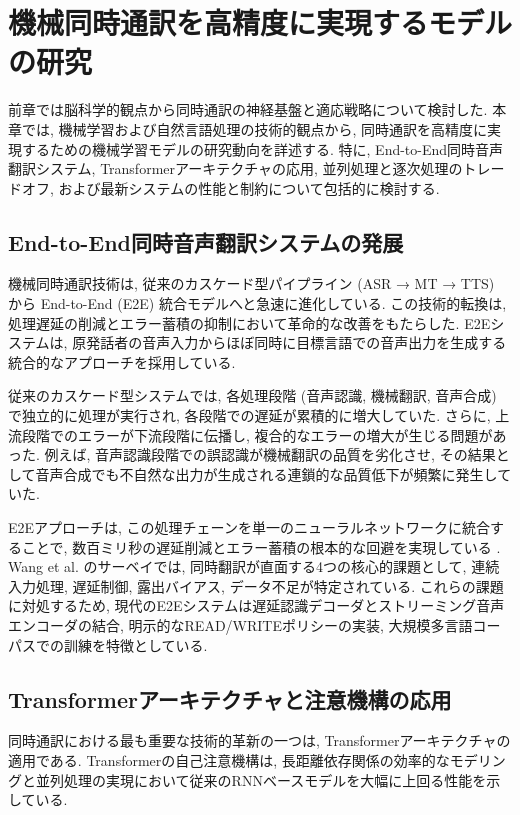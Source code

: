 \section{機械同時通訳を高精度に実現するモデルの研究}

前章では脳科学的観点から同時通訳の神経基盤と適応戦略について検討した.
本章では, 機械学習および自然言語処理の技術的観点から, 同時通訳を高精度に実現するための機械学習モデルの研究動向を詳述する.
特に, End-to-End同時音声翻訳システム, Transformerアーキテクチャの応用, 並列処理と逐次処理のトレードオフ, および最新システムの性能と制約について包括的に検討する.

\subsection{End-to-End同時音声翻訳システムの発展}

機械同時通訳技術は, 従来のカスケード型パイプライン (ASR → MT → TTS) から End-to-End (E2E) 統合モデルへと急速に進化している.
この技術的転換は, 処理遅延の削減とエラー蓄積の抑制において革命的な改善をもたらした.
E2Eシステムは, 原発話者の音声入力からほぼ同時に目標言語での音声出力を生成する統合的なアプローチを採用している.

従来のカスケード型システムでは, 各処理段階 (音声認識, 機械翻訳, 音声合成) で独立的に処理が実行され, 各段階での遅延が累積的に増大していた.
さらに, 上流段階でのエラーが下流段階に伝播し, 複合的なエラーの増大が生じる問題があった.
例えば, 音声認識段階での誤認識が機械翻訳の品質を劣化させ, その結果として音声合成でも不自然な出力が生成される連鎖的な品質低下が頻繁に発生していた.

E2Eアプローチは, この処理チェーンを単一のニューラルネットワークに統合することで, 数百ミリ秒の遅延削減とエラー蓄積の根本的な回避を実現している \cite{wang2024recent}.
Wang et al. \cite{wang2024recent} のサーベイでは, 同時翻訳が直面する4つの核心的課題として, 連続入力処理, 遅延制御, 露出バイアス, データ不足が特定されている.
これらの課題に対処するため, 現代のE2Eシステムは遅延認識デコーダとストリーミング音声エンコーダの結合, 明示的なREAD/WRITEポリシーの実装, 大規模多言語コーパスでの訓練を特徴としている.

\subsection{Transformerアーキテクチャと注意機構の応用}

同時通訳における最も重要な技術的革新の一つは, Transformerアーキテクチャの適用である.
Transformerの自己注意機構は, 長距離依存関係の効率的なモデリングと並列処理の実現において従来のRNNベースモデルを大幅に上回る性能を示している.

